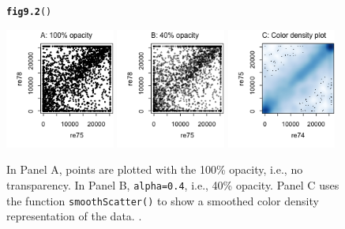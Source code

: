 \documentclass[12pt, a4paper,  BCOR=8.25mm, DIV=15]{scrartcl}\usepackage[]{graphicx}\usepackage[]{color}
\makeatletter
\newcommand{\hlstd}[1]{\textcolor[rgb]{0.345,0.345,0.345}{#1}}%
\newcommand{\hlkwd}[1]{\textcolor[rgb]{0.737,0.353,0.396}{\textbf{#1}}}%
\newenvironment{kframe}{%
 \def\at@end@of@kframe{}%
 \ifinner\ifhmode%
  \def\at@end@of@kframe{\end{minipage}}%
  \begin{minipage}{\columnwidth}%
 \fi\fi%
 \def\FrameCommand##1{\hskip\@totalleftmargin \hskip-\fboxsep
 \colorbox{shadecolor}{##1}\hskip-\fboxsep
     \hskip-\linewidth \hskip-\@totalleftmargin \hskip\columnwidth}%
 \MakeFramed {\advance\hsize-\width
   \@totalleftmargin\z@ \linewidth\hsize
   \@setminipage}}%
 {\par\unskip\endMakeFramed%
 \at@end@of@kframe}
\newenvironment{knitrout}{}{} %
\newcommand{\txtt}[1]{{\texttt{#1}}}
\makeatother
\begin{document}
\begin{figure}[ht]
\begin{knitrout}
\color{fgcolor}\begin{kframe}
\begin{alltt}
\hlkwd{fig9.2}\hlstd{()}
\end{alltt}
\end{kframe}

{\centering \includegraphics[width=0.32\textwidth]{figs/gph-fig9_2e-1} 
\includegraphics[width=0.32\textwidth]{figs/gph-fig9_2e-2} 
\includegraphics[width=0.32\textwidth]{figs/gph-fig9_2e-3} 

}



\end{knitrout}
\caption{In Panel A, points are plotted with the 100\% opacity, i.e.,
  no transparency. In Panel B, \txtt{alpha=0.4}, i.e., 40\% opacity.
  Panel C uses the function \txtt{smoothScatter()} to show a smoothed
  color density representation of the data.
  \label{fig:alpha}.}
\end{figure}
\end{document}
